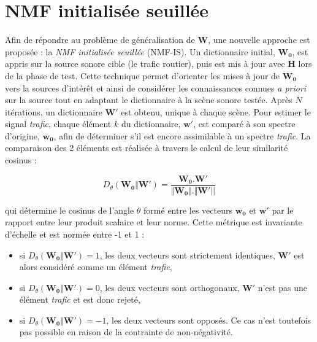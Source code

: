\section{NMF initialisée seuillée}\label{sec:NMF_TI}

Afin de répondre au problème de généralisation de $\mathbf{W}$, une nouvelle approche est proposée : la \textit{NMF initialisée seuillée} (NMF-IS). Un dictionnaire initial, $\mathbf{W_0}$, est appris sur la source sonore cible (le trafic routier), puis est mis à jour avec $\mathbf{H}$ lors de la phase de test.
Cette technique permet d'orienter les mises à jour de $\mathbf{W_0}$ vers la sources d'intérêt et ainsi de considérer les connaissances connues \textit{a priori} sur la source tout en adaptant le dictionnaire à la scène sonore testée. Après $N$ itérations, un dictionnaire $\mathbf{W'}$ est obtenu, unique à chaque scène. Pour estimer le signal \textit{trafic}, chaque élément $k$ du dictionnaire, $\mathbf{w'}$, est comparé à son spectre d'origine, $\mathbf{w_0}$, afin de déterminer s'il est encore assimilable à un spectre \textit{trafic}. La comparaison des 2 éléments est réalisée à travers le calcul de leur similarité cosinus :

\begin{equation}\label{eq:similarite_cosinus}
 D_{\theta}(\mathbf{W_0}\Vert\mathbf{W'}) = \frac{\mathbf{W_0}.\mathbf{W'}}{\Vert\mathbf{W_0}  \Vert. \Vert\mathbf{W'} \vert \vert}
\end{equation}

qui détermine le cosinus de l'angle $\theta$ formé entre les vecteurs $\mathbf{w_0}$ et $\mathbf{w'}$ par le rapport entre leur produit scalaire et leur norme. Cette métrique est invariante d'échelle et est normée entre -1 et 1 :

\begin{itemize}
\item si $D_{\theta}(\mathbf{W_0}\Vert\mathbf{W'}) = 1$, les deux vecteurs sont strictement identiques, $\mathbf{W'}$ est alors considéré comme un élément \textit{trafic},
\item si $D_{\theta}(\mathbf{W_0}\Vert\mathbf{W'}) = 0$, les deux vecteurs sont orthogonaux, $\mathbf{W'}$ n'est pas une élément \textit{trafic} et est donc rejeté,
\item si $D_{\theta}(\mathbf{W_0}\Vert\mathbf{W'}) = -1$, les deux vecteurs sont opposés. Ce cas n'est toutefois pas possible en raison de la contrainte de non-négativité.\\
\end{itemize}

